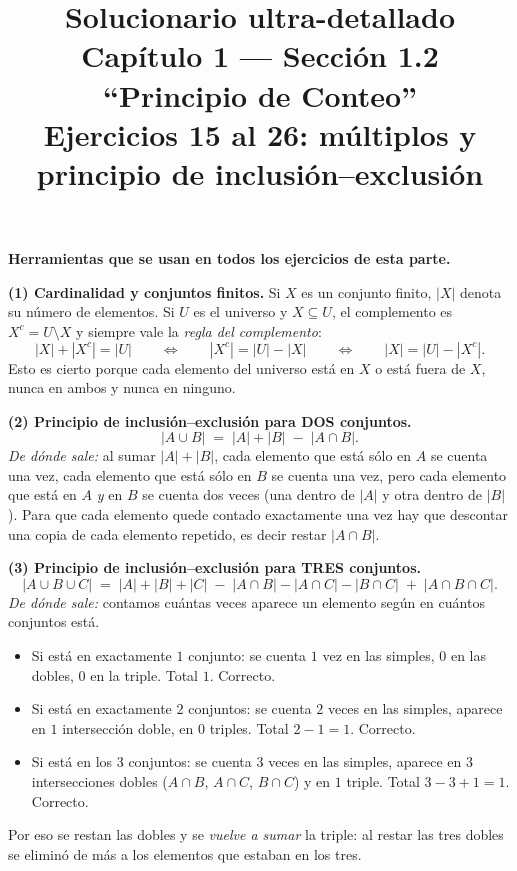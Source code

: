 \documentclass[11pt]{article}
\title{Solucionario ultra-detallado\\[2mm] \large Cap\'itulo 1 --- Secci\'on 1.2 ``Principio de Conteo''\\ Ejercicios 15 al 26: m\'ultiplos y principio de inclusi\'on--exclusi\'on}
\author{}
\date{}
\begin{document}
\maketitle

\begin{teo}
\textbf{Herramientas que se usan en todos los ejercicios de esta parte.}

\medskip
\textbf{(1) Cardinalidad y conjuntos finitos.} Si $X$ es un conjunto finito, $|X|$ denota su n\'umero de elementos. Si $U$ es el universo y $X\subseteq U$, el complemento es $X^{c}=U\setminus X$ y siempre vale la \emph{regla del complemento}:
\[
|X| + |X^{c}| = |U| \qquad\Longleftrightarrow\qquad |X^{c}| = |U| - |X| \qquad\Longleftrightarrow\qquad |X| = |U| - |X^{c}| .
\]
Esto es cierto porque cada elemento del universo est\'a en $X$ o est\'a fuera de $X$, nunca en ambos y nunca en ninguno.

\medskip
\textbf{(2) Principio de inclusi\'on--exclusi\'on para DOS conjuntos.}
\[
|A\cup B| \;=\; |A| + |B| \;-\; |A\cap B|.
\]
\emph{De d\'onde sale:} al sumar $|A|+|B|$, cada elemento que est\'a s\'olo en $A$ se cuenta una vez, cada elemento que est\'a s\'olo en $B$ se cuenta una vez, pero cada elemento que est\'a en $A$ \emph{y} en $B$ se cuenta dos veces (una dentro de $|A|$ y otra dentro de $|B|$). Para que cada elemento quede contado exactamente una vez hay que descontar una copia de cada elemento repetido, es decir restar $|A\cap B|$.

\medskip
\textbf{(3) Principio de inclusi\'on--exclusi\'on para TRES conjuntos.}
\[
|A\cup B\cup C| \;=\; |A|+|B|+|C| \;-\; |A\cap B| - |A\cap C| - |B\cap C| \;+\; |A\cap B\cap C|.
\]
\emph{De d\'onde sale:} contamos cu\'antas veces aparece un elemento seg\'un en cu\'antos conjuntos est\'a.
\begin{itemize}[leftmargin=*]
  \item Si est\'a en exactamente $1$ conjunto: se cuenta $1$ vez en las simples, $0$ en las dobles, $0$ en la triple. Total $1$. Correcto.
  \item Si est\'a en exactamente $2$ conjuntos: se cuenta $2$ veces en las simples, aparece en $1$ intersecci\'on doble, en $0$ triples. Total $2-1=1$. Correcto.
  \item Si est\'a en los $3$ conjuntos: se cuenta $3$ veces en las simples, aparece en $3$ intersecciones dobles ($A\cap B$, $A\cap C$, $B\cap C$) y en $1$ triple. Total $3-3+1=1$. Correcto.
\end{itemize}
Por eso se restan las dobles y se \emph{vuelve a sumar} la triple: al restar las tres dobles se elimin\'o de m\'as a los elementos que estaban en los tres.


\end{teo}
\end{document}
